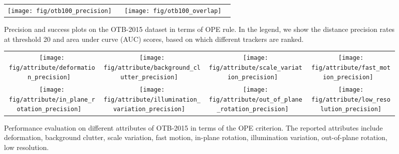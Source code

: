 \documentclass[10pt,twocolumn,letterpaper]{article}
\begin{document}
\begin{figure}[t]
\centering
\begin{tabular}{c@{}c}
\texttt{[image: fig/otb100\_precision]}
\ &
\texttt{[image: fig/otb100\_overlap]}
\ \\
\end{tabular}
\caption{Precision and success plots on the OTB-2015 dataset in terms of OPE rule.
In the legend, we show the distance precision rates at threshold 20 and area under curve (AUC) scores,
based on which different trackers are ranked.}
\label{fig:otb-2015}
\vspace{-2mm}
\end{figure}




\begin{figure*}[t]
\centering
\begin{tabular}{c@{}c@{}c@{}c}
\texttt{[image: fig/attribute/deformation\_precision]}
\ &
\texttt{[image: fig/attribute/background\_clutter\_precision]}
\ &
\texttt{[image: fig/attribute/scale\_variation\_precision]}
\ &
\texttt{[image: fig/attribute/fast\_motion\_precision]}
\ \\
\texttt{[image: fig/attribute/in\_plane\_rotation\_precision]}
\ &
\texttt{[image: fig/attribute/illumination\_variation\_precision]}
\ &
\texttt{[image: fig/attribute/out\_of\_plane\_rotation\_precision]}
\ &
\texttt{[image: fig/attribute/low\_resolution\_precision]}

\end{tabular}
\caption{Performance evaluation on different attributes of OTB-2015 in terms of the OPE criterion.
The reported attributes include deformation, background clutter, scale variation, fast motion,
in-plane rotation, illumination variation, out-of-plane rotation, low resolution.}
\label{fig:attributes}
\vspace{-2mm}
\end{figure*}
\end{document}
